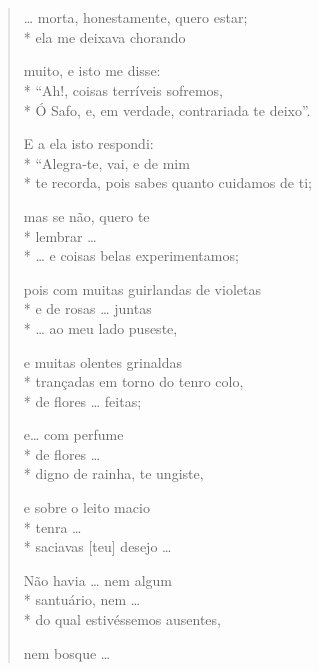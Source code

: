 \section*{}
\begin{verse}
\ldots{} morta, honestamente, quero estar;\\*
ela me deixava chorando

muito, e isto me disse:\\*
``Ah!, coisas terríveis sofremos,\\*
Ó Safo, e, em verdade, contrariada te deixo''.

E a ela isto respondi:\\*
``Alegra-te, vai, e de mim\\*
te recorda, pois sabes quanto cuidamos de ti;

mas se não, quero te\\*
lembrar \ldots{}\\*
\ldots{} e coisas belas experimentamos;

pois com muitas guirlandas de violetas\\*
e de rosas \ldots{} juntas\\*
\ldots{} ao meu lado puseste,			

e muitas olentes grinaldas\\*
trançadas em torno do tenro colo, \\*
de flores \ldots{} feitas;

e\ldots{} com perfume\\*
de flores \ldots{}\\*
digno de rainha, te ungiste,

e sobre o leito macio\\*
tenra \ldots{}\\*
saciavas [teu] desejo \ldots{}

Não havia \ldots{} nem algum\\*
santuário, nem \ldots{}\\*
do qual estivéssemos ausentes, 

nem bosque \ldots{}
\end{verse}

\pagebreak

